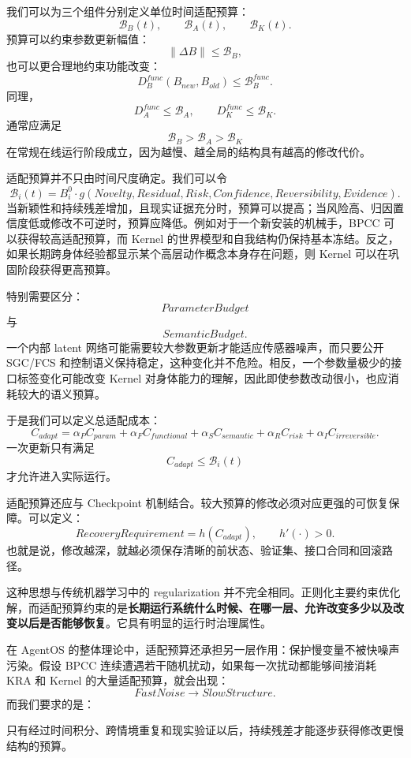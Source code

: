 我们可以为三个组件分别定义单位时间适配预算：
\[
\mathcal B_B(t),
\qquad
\mathcal B_A(t),
\qquad
\mathcal B_K(t).
\]
预算可以约束参数更新幅值：
\[
\|\Delta B\|
\leq
\mathcal B_B,
\]
也可以更合理地约束功能改变：
\[
D_B^{func}
\left(
B_{new},B_{old}
\right)
\leq
\mathcal B_B^{func}.
\]
同理，
\[
D_A^{func}\leq\mathcal B_A,
\qquad
D_K^{func}\leq\mathcal B_K.
\]
通常应满足
\[
\mathcal B_B
>
\mathcal B_A
>
\mathcal B_K
\]
在常规在线运行阶段成立，因为越慢、越全局的结构具有越高的修改代价。

适配预算并不只由时间尺度确定。我们可以令
\[
\mathcal B_i(t)
=
B_i^0
\cdot
g
\left(
Novelty,
Residual,
Risk,
Confidence,
Reversibility,
Evidence
\right).
\]
当新颖性和持续残差增加，且现实证据充分时，预算可以提高；当风险高、归因置信度低或修改不可逆时，预算应降低。例如对于一个新安装的机械手，BPCC 可以获得较高适配预算，而 Kernel 的世界模型和自我结构仍保持基本冻结。反之，如果长期跨身体经验都显示某个高层动作概念本身存在问题，则 Kernel 可以在巩固阶段获得更高预算。

特别需要区分：
\[
ParameterBudget
\]
与
\[
SemanticBudget.
\]
一个内部 latent 网络可能需要较大参数更新才能适应传感器噪声，而只要公开 SGC/FCS 和控制语义保持稳定，这种变化并不危险。相反，一个参数量极少的接口标签变化可能改变 Kernel 对身体能力的理解，因此即使参数改动很小，也应消耗较大的语义预算。

于是我们可以定义总适配成本：
\[
C_{adapt}
=
\alpha_P C_{param}
+
\alpha_F C_{functional}
+
\alpha_S C_{semantic}
+
\alpha_R C_{risk}
+
\alpha_I C_{irreversible}.
\]
一次更新只有满足
\[
C_{adapt}\leq \mathcal B_i(t)
\]
才允许进入实际运行。

适配预算还应与 Checkpoint 机制结合。较大预算的修改必须对应更强的可恢复保障。可以定义：
\[
RecoveryRequirement
=
h(C_{adapt}),
\qquad
h'(\cdot)>0.
\]
也就是说，修改越深，就越必须保存清晰的前状态、验证集、接口合同和回滚路径。

这种思想与传统机器学习中的 regularization 并不完全相同。正则化主要约束优化解，而适配预算约束的是\textbf{长期运行系统什么时候、在哪一层、允许改变多少以及改变以后是否能够恢复}。它具有明显的运行时治理属性。

在 AgentOS 的整体理论中，适配预算还承担另一层作用：保护慢变量不被快噪声污染。假设 BPCC 连续遭遇若干随机扰动，如果每一次扰动都能够间接消耗 KRA 和 Kernel 的大量适配预算，就会出现：
\[
FastNoise
\rightarrow
SlowStructure.
\]
而我们要求的是：
\begin{statementbox}
\centering
{}
\end{statementbox}
只有经过时间积分、跨情境重复和现实验证以后，持续残差才能逐步获得修改更慢结构的预算。

